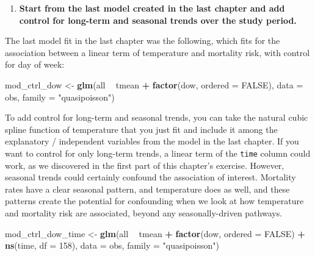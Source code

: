 \documentclass[
]{book}
\newenvironment{Shaded}{\begin{snugshade}}{\end{snugshade}}
\newcommand{\DataTypeTok}[1]{\textcolor[rgb]{0.13,0.29,0.53}{#1}}
\newcommand{\DecValTok}[1]{\textcolor[rgb]{0.00,0.00,0.81}{#1}}
\newcommand{\KeywordTok}[1]{\textcolor[rgb]{0.13,0.29,0.53}{\textbf{#1}}}
\newcommand{\NormalTok}[1]{#1}
\newcommand{\OperatorTok}[1]{\textcolor[rgb]{0.81,0.36,0.00}{\textbf{#1}}}
\newcommand{\OtherTok}[1]{\textcolor[rgb]{0.56,0.35,0.01}{#1}}
\newcommand{\StringTok}[1]{\textcolor[rgb]{0.31,0.60,0.02}{#1}}
\providecommand{\tightlist}{%
  \setlength{\itemsep}{0pt}\setlength{\parskip}{0pt}}
\begin{document}
\begin{enumerate}
\def\labelenumi{\arabic{enumi}.}
\setcounter{enumi}{1}
\tightlist
\item
  \textbf{Start from the last model created in the last chapter and add control for
  long-term and seasonal trends over the study period.}
\end{enumerate}

The last model fit in the last chapter was the following, which fits for the
association between a linear term of temperature and mortality risk, with control
for day of week:

\begin{Shaded}
\begin{Highlighting}[]
\NormalTok{mod_ctrl_dow <-}\StringTok{ }\KeywordTok{glm}\NormalTok{(all }\OperatorTok{~}\StringTok{ }\NormalTok{tmean }\OperatorTok{+}\StringTok{ }\KeywordTok{factor}\NormalTok{(dow, }\DataTypeTok{ordered =} \OtherTok{FALSE}\NormalTok{), }
                    \DataTypeTok{data =}\NormalTok{ obs, }\DataTypeTok{family =} \StringTok{"quasipoisson"}\NormalTok{)}
\end{Highlighting}
\end{Shaded}

To add control for long-term and seasonal trends, you can take the natural cubic
spline function of temperature that you just fit and include it among the
explanatory / independent variables from the model in the last chapter. If you
want to control for only long-term trends, a linear term of the \texttt{time} column
could work, as we discovered in the first part of this chapter's exercise.
However, seasonal trends could certainly confound the association of interest.
Mortality rates have a clear seasonal pattern, and temperature does as well,
and these patterns create the potential for confounding when we look at how
temperature and mortality risk are associated, beyond any seasonally-driven
pathways.

\begin{Shaded}
\begin{Highlighting}[]
\NormalTok{mod_ctrl_dow_time <-}\StringTok{ }\KeywordTok{glm}\NormalTok{(all }\OperatorTok{~}\StringTok{ }\NormalTok{tmean }\OperatorTok{+}\StringTok{ }\KeywordTok{factor}\NormalTok{(dow, }\DataTypeTok{ordered =} \OtherTok{FALSE}\NormalTok{) }\OperatorTok{+}
\StringTok{                           }\KeywordTok{ns}\NormalTok{(time, }\DataTypeTok{df =} \DecValTok{158}\NormalTok{), }
                         \DataTypeTok{data =}\NormalTok{ obs, }\DataTypeTok{family =} \StringTok{"quasipoisson"}\NormalTok{)}
\end{Highlighting}
\end{Shaded}
\end{document}
